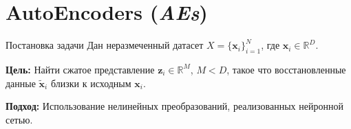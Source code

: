 \section{AutoEncoders (\textit{AEs})}

\begin{frame}{Постановка задачи}
    Дан неразмеченный датасет $X = \{\boldsymbol{x}_i\}_{i=1}^N$, где $\boldsymbol{x}_i \in \mathbb{R}^D$.

    \textbf{Цель:} Найти сжатое представление $\boldsymbol{z}_i \in \mathbb{R}^M$, $M < D$, такое что восстановленные данные $\tilde{\boldsymbol{x}}_i$ близки к исходным $\boldsymbol{x}_i$.

    \textbf{Подход:} Использование нелинейных преобразований, реализованных нейронной сетью.
\end{frame}

